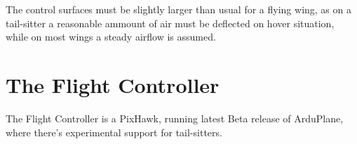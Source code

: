 The control surfaces must be slightly larger than usual for a flying wing, as on a tail-sitter a reasonable ammount of air must be deflected on hover situation, while on most wings a steady airflow is assumed.

\section{The Flight Controller}

The Flight Controller is a PixHawk, running latest Beta release of ArduPlane, where there's experimental support for tail-sitters.


